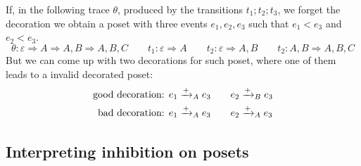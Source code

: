 
\begin{example}
  If, in the following trace $\theta$, produced by the transitions $t_1;t_2;t_3$, we forget the decoration we obtain a poset with three events $e_1,e_2,e_3$ such that $e_1<e_3$ and $e_2<e_3$.
  \[
  \theta:\varepsilon \Rightarrow A \Rightarrow A,B\Rightarrow A,B,C\qquad t_1: \varepsilon \Rightarrow A\qquad t_2: \varepsilon\Rightarrow A,B\qquad t_2: A,B\Rightarrow A,B,C
  \]
  But we can come up with two decorations for such poset, where one of them leads to a invalid decorated poset:
  \begin{align*}
  \text{good decoration: }&e_1\mathrel{\xrightarrow{+}}_A e_3\qquad e_2\mathrel{\xrightarrow{+}}_B e_3\\
  \text{bad decoration: }&e_1\mathrel{\xrightarrow{+}}_A e_3\qquad e_2\mathrel{\xrightarrow{+}}_A e_3
  \end{align*}
\end{example}

\subsection{Interpreting inhibition on posets}


